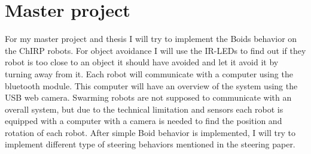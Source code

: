 \section{Master project}
For my master project and thesis I will try to implement the Boids behavior on the ChIRP robots. For object avoidance I will use the IR-LEDs to find out if they robot is too close to an object it should have avoided and let it avoid it by turning away from it. Each robot will communicate with a computer using the bluetooth module. This computer will have an overview of the system using the USB web camera. Swarming robots are not supposed to communicate with an overall system, but due to the technical limitation and sensors each robot is equipped with a computer with a camera is needed to find the position and rotation of each robot. After simple Boid behavior is implemented, I will try to implement different type of steering behaviors mentioned in the steering paper.